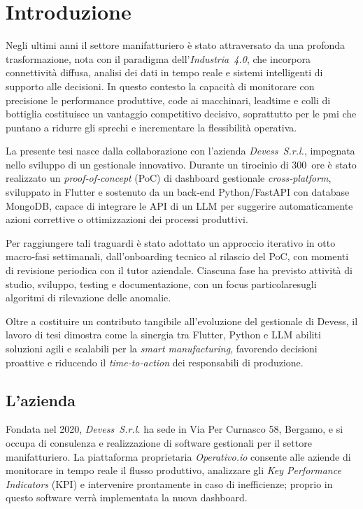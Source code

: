 \chapter{Introduzione}
\label{chap:introduzione}

Negli ultimi anni il settore manifatturiero è stato attraversato da una profonda trasformazione, nota con il paradigma dell’\textit{Industria~4.0}, che 
incorpora connettività diffusa, analisi dei dati in tempo reale e sistemi intelligenti di supporto alle decisioni. In questo contesto la capacità di monitorare con 
precisione le performance produttive, code ai macchinari, \gls{leadtime} e colli di bottiglia costituisce un vantaggio competitivo decisivo, soprattutto per le \gls{pmi} che puntano a ridurre gli sprechi e incrementare la flessibilità operativa.

La presente tesi nasce dalla collaborazione con l’azienda \textit{Devess~S.r.l.}, impegnata nello sviluppo di un gestionale innovativo. Durante un tirocinio di 300~ore è 
stato realizzato un \textit{proof‑of‑concept} (\gls{PoC}) di dashboard gestionale \textit{cross‑platform}, sviluppato in Flutter e sostenuto da un back‑end Python/FastAPI 
con database MongoDB, capace di integrare le \gls{API} di un \gls{LLM} per suggerire automaticamente azioni correttive o ottimizzazioni dei processi produttivi.

Per raggiungere tali traguardi è stato adottato un approccio iterativo in otto macro‑fasi settimanali, dall’onboarding tecnico al rilascio del PoC, con momenti di revisione 
periodica con il tutor aziendale. Ciascuna fase ha previsto attività di studio, sviluppo, testing e documentazione, con un focus particolaresugli algoritmi di rilevazione delle anomalie.

Oltre a costituire un contributo tangibile all’evoluzione del gestionale di Devess, il lavoro di tesi dimostra come la sinergia tra Flutter, Python e LLM abiliti soluzioni 
agili e scalabili per la \textit{smart manufacturing}, favorendo decisioni proattive e riducendo il \textit{time‑to‑action} dei responsabili di produzione.

\section{L'azienda}
Fondata nel 2020, \textit{Devess~S.r.l.} ha sede in Via Per Curnasco 58, Bergamo, e si occupa di consulenza e realizzazione di software gestionali per il settore manifatturiero. 
La piattaforma proprietaria \textit{Operativo.io} consente alle aziende di monitorare in tempo reale il flusso produttivo, analizzare gli \textit{Key Performance Indicators} 
(\gls{KPI}) e intervenire prontamente in caso di inefficienze; proprio in questo software verrà implementata la nuova dashboard.

